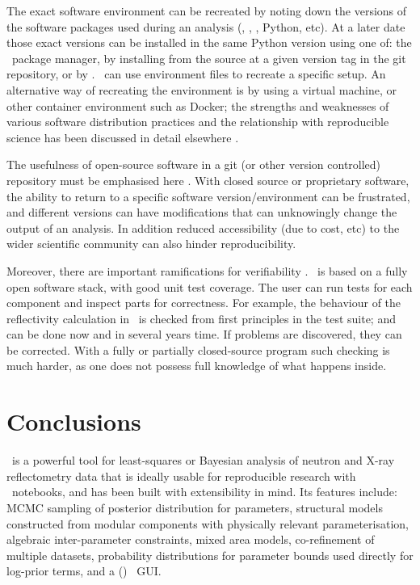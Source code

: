 \documentclass[pdf,preprint]{article}
\begin{document}
The exact software environment can be recreated by noting down the versions of the software packages used during an analysis (, \SciPy, \NumPy, Python, etc). At a later date those exact versions can be installed in the same Python version using one of: the \conda\ package manager, by installing from the source at a given version tag in the git repository, or by \pip. \conda\ can use environment files to recreate a specific setup. An alternative way of recreating the environment is by using a virtual machine, or other container environment such as Docker; the strengths and weaknesses of various software distribution practices and the relationship with reproducible science has been discussed in detail elsewhere \cite{Moeller2017a}.

The usefulness of open-source software in a git (or other version controlled) repository must be emphasised here \cite{Moeller2017a}. With closed source or proprietary software, the ability to return to a specific software version/environment can be frustrated, and different versions can have modifications that can unknowingly change the output of an analysis. In addition reduced accessibility (due to cost, etc) to the wider scientific community can also hinder reproducibility.

Moreover, there are important ramifications for verifiability \cite{Chirigati2013}. \ is based on a fully open software stack, with good unit test coverage. The user can run tests for each component and inspect parts for correctness. For example, the behaviour of the reflectivity calculation in \ is checked from first principles in the test suite; and can be done now and in several years time. If problems are discovered, they can be corrected. With a fully or partially closed-source program such checking is much harder, as one does not possess full knowledge of what happens inside.

\section{Conclusions}\label{conclusions}

\ is a powerful tool for least-squares or Bayesian analysis of neutron and X-ray reflectometry data that is ideally usable for reproducible research with \Jupyter\ notebooks, and has been built with extensibility in mind. Its features include: MCMC sampling of posterior distribution for parameters, structural models constructed from modular components with physically relevant parameterisation, algebraic inter-parameter constraints, mixed area models, co-refinement of multiple datasets, probability distributions for parameter bounds used directly for log-prior terms, and a (\Jupyter) \ipywidgets\ GUI.
\end{document}

